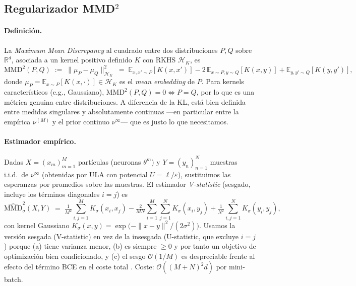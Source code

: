 \documentclass[11pt, a4paper]{article}
\theoremstyle{definition}
\newcommand{\R}{\mathbb{R}}
\newcommand{\E}{\mathbb{E}}
\newcommand{\eps}{\varepsilon}
\begin{document}
\subsection{Regularizador MMD$^2$}
\label{sec:reg-moons-mmd}

\paragraph{Definición.} La \emph{Maximum Mean Discrepancy} al
cuadrado entre dos distribuciones $P, Q$ sobre $\R^d$, asociada a un
kernel positivo definido $K$ con RKHS $\mathcal H_K$, es
\cite{Gretton2012}
\[
  \mathrm{MMD}^2(P, Q) \;:=\;
  \bigl\| \mu_P - \mu_Q \bigr\|_{\mathcal H_K}^2
  \;=\;
  \E_{x,x'\sim P}[K(x,x')] - 2\,\E_{x\sim P, y\sim Q}[K(x,y)]
  + \E_{y,y'\sim Q}[K(y,y')],
\]
donde $\mu_P = \E_{x\sim P}[K(x,\cdot)] \in \mathcal H_K$ es el
\emph{mean embedding} de $P$. Para kernels característicos (e.g.,
Gaussiano), $\mathrm{MMD}^2(P,Q)=0 \iff P=Q$, por lo que es una
métrica genuina entre distribuciones. A diferencia de la KL, está
bien definida entre medidas singulares y absolutamente continuas
---en particular entre la empírica $\nu^{(M)}$ y el prior continuo
$\nu^\infty$--- que es justo lo que necesitamos.

\paragraph{Estimador empírico.} Dadas $X = (x_m)_{m=1}^M$ partículas
(neuronas $\theta^m$) y $Y = (y_n)_{n=1}^N$ muestras i.i.d.\ de
$\nu^\infty$ (obtenidas por ULA con potencial $U=\ell/\eps$),
sustituimos las esperanzas por promedios sobre las muestras. El
estimador \emph{V-statistic} (sesgado, incluye los términos
diagonales $i=j$) es
\[
  \widehat{\mathrm{MMD}}^2_\sigma(X, Y) \;=\;
  \tfrac{1}{M^2}\!\sum_{i,j=1}^M\! K_\sigma(x_i, x_j)
  - \tfrac{2}{M N}\!\sum_{i=1}^M\!\sum_{j=1}^N\! K_\sigma(x_i, y_j)
  + \tfrac{1}{N^2}\!\sum_{i,j=1}^N\! K_\sigma(y_i, y_j),
\]
con kernel Gaussiano
$K_\sigma(x, y) = \exp\!\bigl(-\|x - y\|^2/(2\sigma^2)\bigr)$.
Usamos la versión sesgada (V-statistic) en vez de la insesgada
(U-statistic, que excluye $i=j$) porque (a) tiene varianza menor,
(b) es siempre $\geq 0$ y por tanto un objetivo de optimización bien
condicionado, y (c) el sesgo $\mathcal O(1/M)$ es despreciable frente
al efecto del término BCE en el coste total
\cite{Gretton2012,Sutherland2017}. Coste: $\mathcal O((M+N)^2 d)$ por
mini-batch.
\end{document}
